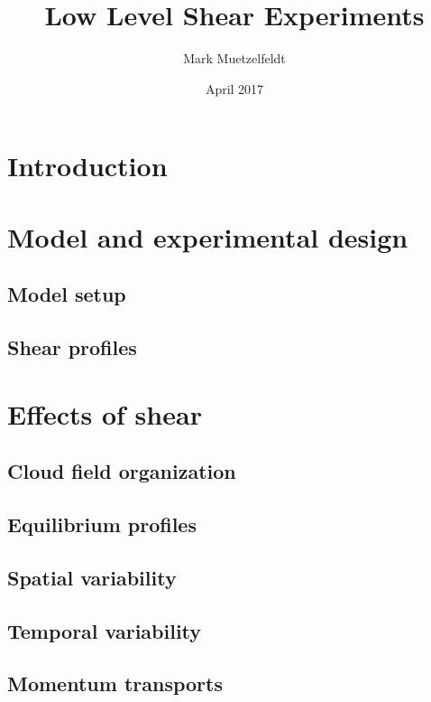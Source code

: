 \documentclass{article}
\title{Low Level Shear Experiments}
\author{Mark Muetzelfeldt}
\date{April 2017}
\begin{document}
\maketitle

\section{Introduction}

\section{Model and experimental design}
\subsection{Model setup}

\subsection{Shear profiles}


\section{Effects of shear}
\subsection{Cloud field organization}
\subsection{Equilibrium profiles}
\subsection{Spatial variability}
\subsection{Temporal variability}
\subsection{Momentum transports}
\end{document}
